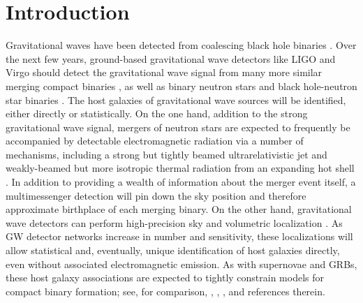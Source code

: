 \documentclass[nofootinbib,twocolumn,prd]{emulateapj}
\newcommand\editremark[1]{{\color{red}#1}}
\begin{document}






\section{Introduction}
Gravitational waves have been detected from  coalescing  black hole binaries \citep{DiscoveryPaper,LIGO-O1-BBH}. 
Over the next few years, ground-based gravitational wave detectors like LIGO 
and Virgo  should detect the gravitational
wave signal from many more similar merging compact binaries \citep{LIGO-O1-BBH,RatesPaper,gwastro-EventPopsynPaper-2016}, as well as  binary  neutron stars and black hole-neutron star binaries \citep{LIGO-Inspiral-Rates,popsyn-LowMetallicityImpact2c-StarTrackRevised-2014}.
%
The host galaxies of gravitational wave sources will be identified, either directly or statistically.  
On the one hand, addition to the strong gravitational wave signal, mergers of neutron stars are expected to  frequently be accompanied by detectable
electromagnetic radiation  via a number of  mechanisms, including a strong but tightly beamed
ultrarelativistic jet and weakly-beamed but more isotropic thermal radiation from an expanding hot shell
\citep[see,e.g.,][and references therein]{2013PhRvL.111r1101C,short-grb-GWCoincidenceEM-MetzgerBerger2011}.  
In addition to providing a wealth of information about the merger event itself, a multimessenger detection will pin down
the sky position and therefore approximate birthplace of each merging binary.    
%
On the other hand, gravitational wave detectors can perform high-precision sky and volumetric localization \citep{2016LRR....19....1A,2016arXiv160307333S}.  As GW detector
networks increase in number and sensitivity, these localizations will allow statistical and, eventually, unique identification of
host galaxies directly, even without associated electromagnetic emission.
%
As with supernovae and  GRBs, these host galaxy associations   are expected to tightly constrain models for compact binary
formation; see, for comparison,  \citet{2011MNRAS.412.1508M}, \citet{long-grb-GuettaPiran2007},
\citet{2014ARAA..52...43B}, and references therein. %
%
\end{document}
